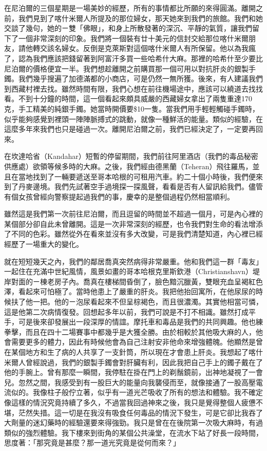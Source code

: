 在尼泊爾的三個星期是一場美妙的經歷，所有的事情都比所願的來得圓滿。離開之前，我們見到了喀什米爾人所提及的那位婦女，那天她來到我們的旅館。我們和她交談了幾句，她的ㄧ雙「佛眼」，和身上所散發著的深沉、平靜的氣質，讓我們留下了一個非常深刻的印象。我們將一個裝有廿十美元的信封交給那位喀什米爾朋友，請他轉交該名婦女。反倒是克萊斯對這個喀什米爾人有所保留。他以為我瘋了，認為我們應該把錢留著到阿富汗多買一些哈希什大麻。那裡的哈希什至少要比尼泊爾的價格便宜一半。我們想趁離開之前購買那一個可用以對抗肝炎的銀製手鐲。我們幾乎搜遍了加德滿都的小商店，可是仍然一無所獲。後來，有人建議我們到西藏村裡去找。雖然時間有限，我們心想在前往機場途中，應該可以繞道去找找看。不到十分鐘的時間，這一個看起來頗具威嚴的西藏婦女拿出了兩隻重達170克，手工精美的純銀手鐲。她當時開價要\$10一隻。當我們用手輕輕觸碰手鐲時，似乎能夠感覺到裡頭一陣陣脈搏式的跳動，就像一種鮮活的能量。類似的經驗，在這麼多年來我們也只是碰過一次。離開尼泊爾之前，我們已經決定了，一定要再回來。

在坎達哈省（Kandahar）短暫的停留期間，我們前往阿里酒店（我們的毒品秘密供應處）欲領等候多時的大麻。之後，我們經由德黑蘭（Teheran）飛往羅馬，並且在當地找到了一輛要遞送至哥本哈根的可租用汽車。約二十個小時後，我們便來到了丹麥邊境。我們先試著空手過境探一探風聲，看看是否有人留訊給我們。儘管有個女孩曾經向警察提起過我們的事，慶幸的是整個過程仍然相當順利。

雖然這是我們第一次前往尼泊爾，而且逗留的時間並不超過一個月，可是內心裡的某個部分卻自此未曾離開。這是一次非常深刻的經歷，也令我們對生命的看法增添了不同的色彩。雖然從外在看來並沒有多大改變，可是我們清楚知道，內心裡已經經歷了一場重大的變化。

就在短短幾天之內，我們的鄰居喬真突然病得非常嚴重。他和我們這一群「毒友」一起住在充滿中世紀風情，風景如畫的哥本哈根克里斯欽港（Christianshavn）堤岸對面的ㄧ棟老房子內。喬真在樓梯間昏倒了，臉色黯沉臘黃，雙眼充血呈褐紅色澤，看起來可怕極了。當時他患上了嚴重的肝炎。我把他抬回寓所，在他尿尿的時候扶了他一把。他的ㄧ泡尿看起來不但呈棕褐色，而且很濃濁。其實他相當可憐，這是他第二次病情復發。回想起多年以前，我們可說是不打不相識。雖然打成平手，可是後來卻發展出一段深厚的情誼。摩托車和毒品是我們的共同興趣。他也練拳擊，而且在四十二場賽事中都幾乎是大獲全勝。由於相較於其他吸大麻的人，他會需要更多的體力，因此有時候他會為自己注射安非他命來增強體魄。他顯然是曾在某個地方和生了病的人共享了一支針筒，所以現在才會患上肝炎。我想起了喀什米爾人曾經說過，我們的銀製手鐲會對肝臟有利，因此我把自己手上的鐲子戴在了他的手腕上。曾有那麼一瞬間，我停駐在掛在門上的剃鬚鏡前，出神地凝視了一會兒。忽然之間，我感受到有一股巨大的能量向我襲侵而至，就像接通了一股高壓電流似的。我像柱子般佇立著，似乎有一道光芒吸收了所有的想法和體驗。我不確定像這樣的情況究竟持續了多久，不過當我回過神來之後，我只是覺得整個人疲憊不堪，茫然失措。這一切是在我沒有吸食任何毒品的情況下發生，可是它卻比我吞了大劑量的迷幻藥時的經驗還要來得強勁。我只是曾在在後院第一次吸大麻時，有過類似的強烈體驗。我下樓來到街角的某個公共澡堂，在流水下站了好長一段時間，思度著：「那究竟是甚麼？那一道光究竟是從何而來？」

